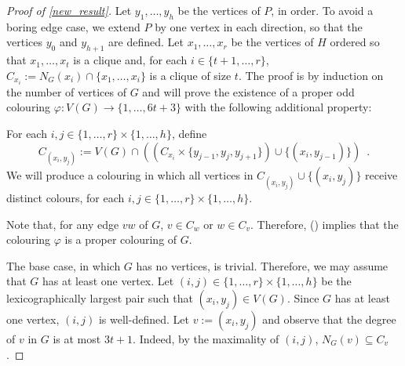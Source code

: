 \documentclass{patmorin}
\begin{document}
\begin{proof}[Proof of \cref{new_result}]
  Let $y_1,\ldots,y_h$ be the vertices of $P$, in order.  To avoid a boring edge case, we extend $P$ by one vertex in each direction, so that the vertices $y_0$ and $y_{h+1}$ are defined.  Let $x_1,\ldots,x_r$ be the vertices of $H$ ordered so that $x_1,\ldots,x_{t}$ is a clique and, for each $i\in\{t+1,\ldots,r\}$, $C_{x_i}:=N_G(x_i)\cap\{x_1,\ldots,x_{i}\}$ is a clique of size $t$.  The proof is by induction on the number of vertices of $G$ and will prove the existence of a proper odd colouring $\varphi:V(G)\to\{1,\ldots,6t+3\}$ with the following additional property:
  \begin{compactitem}[(\ding{96})]
    \item For each $i,j\in\{1,\ldots,r\}\times \{1,\ldots,h\}$, define
    \[
      C_{(x_i,y_j)}:=V(G)\cap ((C_{x_i}\times\{y_{j-1}, y_{j},y_{j+1}\})\cup\{(x_i,y_{j-1})\})
      \enspace .
    \]
    We will produce a colouring in which all vertices in $C_{(x_i,y_j)}\cup\{(x_i,y_j)\}$ receive distinct colours, for each $i,j\in\{1,\ldots,r\}\times\{1,\ldots,h\}$.
  \end{compactitem}
  Note that, for any edge $vw$ of $G$, $v \in C_w$ or $w\in C_v$.  Therefore, () implies that the colouring $\varphi$ is a proper colouring of $G$.



  The base case, in which $G$ has no vertices, is trivial. Therefore, we may assume that $G$ has at least one vertex.  Let $(i,j)\in\{1,\ldots,r\}\times\{1,\ldots,h\}$ be the lexicographically largest pair such that $(x_i,y_j)\in V(G)$.  Since $G$ has at least one vertex, $(i,j)$ is well-defined.  Let $v:=(x_i,y_j)$ and observe that the degree of $v$ in $G$ is at most $3t+1$. Indeed, by the maximality of $(i,j)$,  $N_G(v)\subseteq C_v$.


\end{proof}
\end{document}

